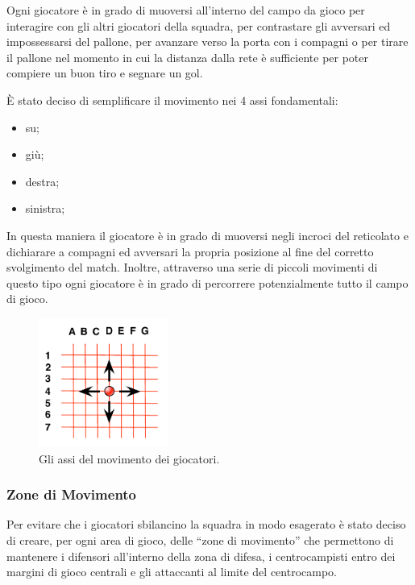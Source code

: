 \documentclass[aps,letterpaper,10pt]{article}
\begin{document}
Ogni giocatore \`e in grado di muoversi all'interno del campo da gioco per interagire con gli altri giocatori della squadra, per contrastare gli avversari ed impossessarsi del pallone, per avanzare verso la porta con i compagni o per tirare il pallone nel momento in cui la distanza dalla rete \`e sufficiente per poter compiere un buon tiro e segnare un gol. \vspace{3mm}

\`E stato deciso di semplificare il movimento nei 4 assi fondamentali:

\begin{itemize}
	\item su;
	\item gi\`u;
	\item destra;
	\item sinistra;
\end{itemize}

In questa maniera il giocatore \`e in grado di muoversi negli incroci del reticolato e dichiarare a compagni ed avversari la propria posizione al fine del corretto svolgimento del match. Inoltre, attraverso una serie di piccoli movimenti di questo tipo ogni giocatore \`e in grado di percorrere potenzialmente tutto il campo di gioco.

\begin{figure}[H]
	\begin{center}
		\includegraphics[width=160px]{images/movement.pdf}
	\end{center}
\caption{Gli assi del movimento dei giocatori.}
\end{figure}

\subsubsection{Zone di Movimento}
\label{zone}

Per evitare che i giocatori sbilancino la squadra in modo esagerato \`e stato deciso di creare, per ogni area di gioco, delle ``zone di movimento'' che permettono di mantenere i difensori all'interno della zona di difesa, i centrocampisti entro dei margini di gioco centrali e gli attaccanti al limite del centrocampo. \vspace{3mm}
\end{document}
